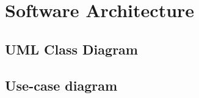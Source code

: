 \pagebreak
\chapter{Software Architecture}
\label{chap:soft_arch}
\section{UML Class Diagram}
\section{Use-case diagram}